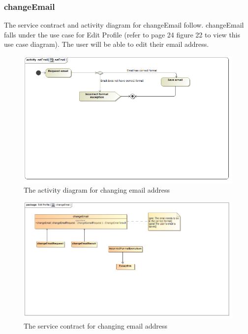 \documentclass[a4paper,12pt]{report}
\begin{document}
\subsubsection{changeEmail}
The service contract and activity diagram for changeEmail follow. changeEmail falls under the use case for Edit Profile (refer to page 24 figure 22 to view this use case diagram). The user will be able to edit their email address.
\begin{figure}[H]
  \centering
    \includegraphics[width=1.0\textwidth]{../Diagrams/ManageProfile/ActivityDiagrams/setEmail1.png} 
    \caption{The activity diagram for changing email address}
\end{figure}
	
\begin{figure}[H]
	\centering
	\includegraphics[width=1.0\textwidth]{../Diagrams/ManageProfile/serviceContracts/changeEmailServiceContract.png}
	\caption{The service contract for changing email address}
\end{figure}
\end{document}

